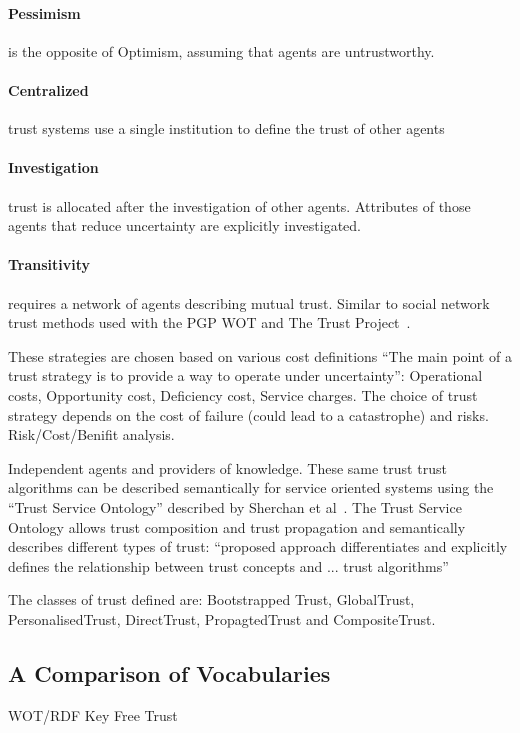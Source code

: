 \documentclass{acm_proc_article-sp}
\begin{document}
\paragraph{Pessimism} is the opposite of Optimism, assuming that agents are untrustworthy.
\paragraph{Centralized} trust systems use a single institution to define the trust of other agents
\paragraph{Investigation} trust is allocated after the investigation of other agents. Attributes of those agents that reduce uncertainty are explicitly investigated.
\paragraph{Transitivity} requires a network of agents describing mutual trust. Similar to social network trust methods used with the PGP WOT and The Trust Project~\cite{_how_pgp_1999,golbeck_trust_2003}.

These strategies are chosen based on various cost definitions ``The main point of a trust strategy is to provide a way to operate under uncertainty'': Operational costs, Opportunity cost, Deficiency cost, Service charges. The choice of trust strategy depends on the cost of failure (could lead to a catastrophe) and risks.  Risk/Cost/Benifit analysis.

Independent agents and providers of knowledge. These same trust trust algorithms can be described semantically for service oriented systems using the ``Trust Service Ontology'' described by Sherchan et al~\cite{sherchan_trust_2010}. The Trust Service Ontology allows trust composition and trust propagation and semantically describes different types of trust: ``proposed approach differentiates and explicitly
defines the relationship between trust concepts and ... trust algorithms''

The classes of trust defined are: Bootstrapped Trust, GlobalTrust, PersonalisedTrust, DirectTrust, PropagtedTrust and CompositeTrust.

\subsection{A Comparison of Vocabularies}
WOT/RDF
Key Free Trust
\end{document}
